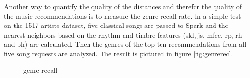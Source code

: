 Another way to quantify the quality of the distances and therefor the quality of the music recommendations is to measure the genre recall rate. In a simple test on the 1517 artists dataset, five classical songs are passed to Spark and the nearest neighbors based on the rhythm and timbre features (skl, js, mfcc, rp, rh and bh) are calculated. Then the genres of the top ten recommendations from all five song requests are analyzed. The result is pictured in figure \ref{fig:genrerec}.  

\begin{figure}[htbp]
	\centering
	\caption{genre recall}
	\label{fig:1517gen}
\end{figure}

